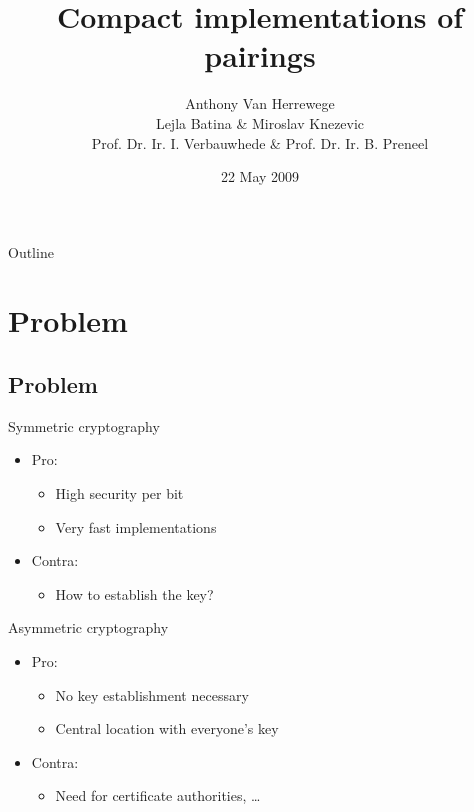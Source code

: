 \documentclass[svgnames]{beamer}
\title{Compact implementations of pairings}
\author[Anthony Van Herrewege]{Anthony Van Herrewege\\[2em]
\small Lejla Batina \& Miroslav Knezevic\\
Prof. Dr. Ir. I. 	Verbauwhede \& Prof. Dr. Ir. B. Preneel}
\date{22 May 2009}
\begin{document}
\frame{\titlepage}

\section[Outline]{}
\begin{frame}{Outline}
  \tableofcontents
\end{frame}

\section{Problem}
\subsection*{Problem}
\begin{frame}{Symmetric cryptography}
	\begin{itemize}
		\item Pro:
			\begin{itemize}
				\item High security per bit
				\item Very fast implementations
			\end{itemize}
		\item Contra:
			\begin{itemize}
				\item How to establish the key?
			\end{itemize}		
	\end{itemize}
\end{frame}

\begin{frame}{Asymmetric cryptography}
	\begin{itemize}
		\item Pro:
			\begin{itemize}
				\item No key establishment necessary
				\item Central location with everyone's key
			\end{itemize}
		\item Contra:
			\begin{itemize}
				\item Need for certificate authorities, \ldots
			\end{itemize}		
	\end{itemize}
\end{frame}
\end{document}
